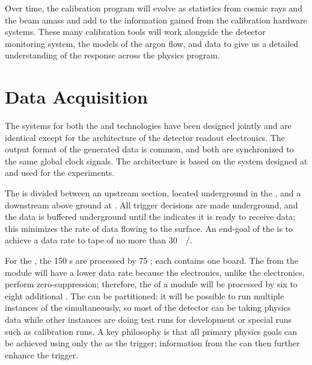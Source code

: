Over time, the  calibration program will evolve as statistics from cosmic rays and the  beam amass and add to the information gained from the calibration hardware systems. These many calibration tools will work alongside the detector monitoring system, the  models of the argon flow, and  data to give us a detailed understanding of the  response across the  physics program.



\section{Data Acquisition}
\label{sec:exec-sp-daq}

The  systems for both the  and  technologies have been designed jointly and are identical except for the architecture of the detector readout electronics.  
The output format of the generated data is common, and both are synchronized to the same global clock signals.  The  architecture is based on the  system designed at  and used for the  experiments. 

The  is divided between an upstream section, located underground in the , and a downstream  above ground at . All trigger decisions are made underground, and the data is buffered underground until the  indicates it is ready to receive data; this minimizes the rate of data flowing to the surface. An end-goal of the  is to achieve a data rate to tape of no more than \SI{30}{\peta\byte/\year}.

For the , the 150 s are processed by 75 ; each  contains one  board. The  from the module will have a lower data rate because the  electronics, unlike the  electronics, perform zero-suppression; therefore, the  of a module will be processed by six to eight additional . The  can be partitioned: it will be possible to run multiple instances of the  simultaneously, so most of the detector can be taking physics data while other  instances are doing test runs for development or special runs such as calibration runs. A key philosophy is that all primary  physics goals can be achieved using only the  as the trigger; information from the  can then further enhance the trigger.


